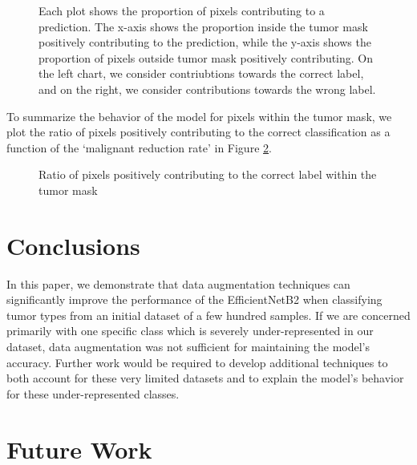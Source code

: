 \documentclass[sn-mathphys,Numbered]{sn-jnl}%
\theoremstyle{thmstyleone}%
\theoremstyle{thmstyletwo}%
\theoremstyle{thmstylethree}%
\begin{document}
\begin{figure}[!htbp]
    \centering


    \caption{Each plot shows the proportion of pixels contributing to a prediction.  The x-axis shows the proportion inside the tumor mask positively contributing to the prediction, while the y-axis shows the proportion of pixels outside tumor mask positively contributing.  On the left chart, we consider contriubtions towards the correct label, and on the right, we consider contributions towards the wrong label.}
    \label{fig:proportion}
\end{figure}



To summarize the behavior of the model for pixels within the tumor mask, we plot the ratio of pixels positively contributing to the correct classification as a function of the `malignant reduction rate' in Figure \ref{fig:mal_ben_line}.
\begin{figure}[!htbp]
    \centering


    \caption{Ratio of pixels positively contributing to the correct label within the tumor mask}
    \label{fig:mal_ben_line}
\end{figure}
\section{Conclusions}\label{sec_conclusion}
In this paper, we demonstrate that data augmentation techniques can significantly improve the performance of the EfficientNetB2 when classifying tumor types from an initial dataset of a few hundred samples.  If we are concerned primarily with one specific class which is severely under-represented in our dataset, data augmentation was not sufficient for maintaining the model's accuracy.  Further work would be required to develop additional techniques to both account for these very limited datasets and to explain the model's behavior for these under-represented classes.  
\section{Future Work}\label{sec_future}
\end{document}
